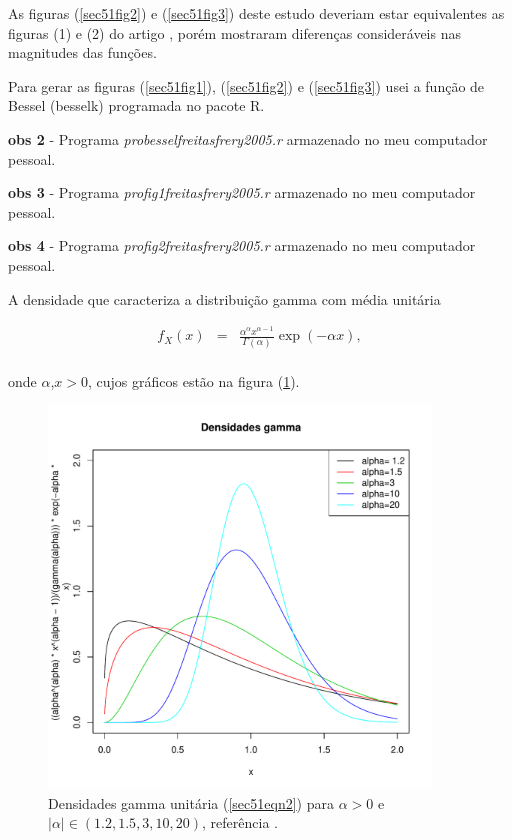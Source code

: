 \documentclass[10pt,a4paper]{article}
\begin{document}
	
As figuras (\ref{sec51fig2}) e (\ref{sec51fig3}) deste estudo deveriam estar equivalentes as figuras (1) e (2) do artigo \cite{freitas_frery_2005}, porém mostraram diferenças consideráveis nas magnitudes das funções. 

Para gerar as figuras (\ref{sec51fig1}), (\ref{sec51fig2}) e (\ref{sec51fig3}) usei a função de Bessel (besselk) programada no pacote R.

{\bf obs 2} - Programa {\it probesselfreitasfrery2005.r} armazenado no meu computador pessoal.

{\bf obs 3} - Programa {\it profig1freitasfrery2005.r} armazenado no meu computador pessoal.

{\bf obs 4} - Programa {\it profig2freitasfrery2005.r} armazenado no meu computador pessoal.

A densidade que caracteriza a distribuição gamma com média unitária

\begin{equation}\label{sec51eqn2}
\begin{array}{ccc}
	f_{X}(x)&=&\frac{\alpha^{\alpha}x^{\alpha-1}}{\Gamma(\alpha)}\exp\left(-\alpha x\right), \\
\end{array}
\end{equation}

onde $\alpha$,$x>0$, cujos gráficos estão na figura (\ref{sec51fig4}).

\begin{figure}[!htb]
\centering
\includegraphics[width=4.0in]{fig3a_freitas_frery_2005.pdf}
	\caption{Densidades  gamma unitária (\ref{sec51eqn2}) para $\alpha > 0$ e $|\alpha|\in(1.2,1.5,3,10,20)$, referência \cite{freitas_frery_2005} .}
\label{sec51fig4}
\end{figure}
\end{document}

